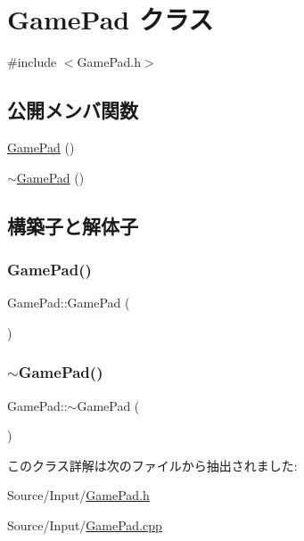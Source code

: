 \hypertarget{class_game_pad}{}\section{Game\+Pad クラス}
\label{class_game_pad}


{\ttfamily \#include $<$Game\+Pad.\+h$>$}

\subsection*{公開メンバ関数}
\begin{DoxyCompactItemize}
\item 
\mbox{\hyperlink{class_game_pad_a8b37c2e8a0c353d0484c413eb099ce0b}{Game\+Pad}} ()
\item 
\mbox{\hyperlink{class_game_pad_acd55fa1169f026809f35f080c829ecfd}{$\sim$\+Game\+Pad}} ()
\end{DoxyCompactItemize}


\subsection{構築子と解体子}
\mbox{\label{class_game_pad_a8b37c2e8a0c353d0484c413eb099ce0b}} 
\subsubsection{\texorpdfstring{Game\+Pad()}{GamePad()}}
{\footnotesize\ttfamily Game\+Pad\+::\+Game\+Pad (\begin{DoxyParamCaption}{ }\end{DoxyParamCaption})}

\mbox{\label{class_game_pad_acd55fa1169f026809f35f080c829ecfd}} 
\subsubsection{\texorpdfstring{$\sim$\+Game\+Pad()}{~GamePad()}}
{\footnotesize\ttfamily Game\+Pad\+::$\sim$\+Game\+Pad (\begin{DoxyParamCaption}{ }\end{DoxyParamCaption})}



このクラス詳解は次のファイルから抽出されました\+:\begin{DoxyCompactItemize}
\item 
Source/\+Input/\mbox{\hyperlink{_game_pad_8h}{Game\+Pad.\+h}}\item 
Source/\+Input/\mbox{\hyperlink{_game_pad_8cpp}{Game\+Pad.\+cpp}}\end{DoxyCompactItemize}
